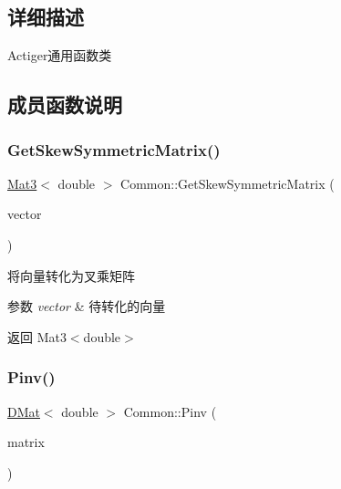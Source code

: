 \subsection{详细描述}
Actiger通用函数类 

\subsection{成员函数说明}
\mbox{\label{classquadruped_1_1Common_a8b05a953662bcadd1cd3bf7dd17ae866}} 
\subsubsection{\texorpdfstring{Get\+Skew\+Symmetric\+Matrix()}{GetSkewSymmetricMatrix()}}
{\footnotesize\ttfamily \hyperlink{cppTypes_8h_adb7d462b35d31f0b2583b3e230a2a2c3}{Mat3}$<$ double $>$ Common\+::\+Get\+Skew\+Symmetric\+Matrix (\begin{DoxyParamCaption}\item[{\hyperlink{cppTypes_8h_a65c27bf97693676535dd0b30ea0ad399}{Vec3}$<$ double $>$}]{vector }\end{DoxyParamCaption})\hspace{0.3cm}{\ttfamily [static]}}



将向量转化为叉乘矩阵 


\begin{DoxyParams}{参数}
{\em vector} & 待转化的向量 \\
\hline
\end{DoxyParams}
\begin{DoxyReturn}{返回}
Mat3$<$double$>$ 
\end{DoxyReturn}
\mbox{\label{classquadruped_1_1Common_a972d5fc8430f5aa57706d0a7f0cc267e}} 
\subsubsection{\texorpdfstring{Pinv()}{Pinv()}}
{\footnotesize\ttfamily \hyperlink{cppTypes_8h_a5db6bfb25afa103db1fb6bb6287ae9d7}{D\+Mat}$<$ double $>$ Common\+::\+Pinv (\begin{DoxyParamCaption}\item[{\hyperlink{cppTypes_8h_a5db6bfb25afa103db1fb6bb6287ae9d7}{D\+Mat}$<$ double $>$}]{matrix }\end{DoxyParamCaption})\hspace{0.3cm}{\ttfamily [static]}}



